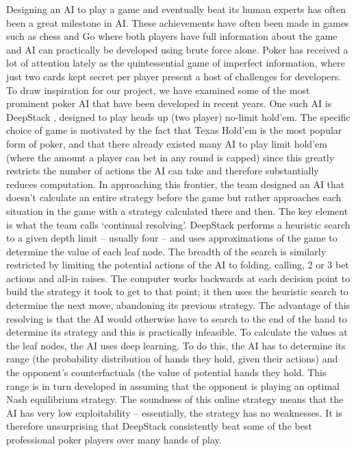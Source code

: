 \documentclass{article}
\begin{document}
\begin{multicols*}{2}
Designing an AI to play a game and eventually beat its human experts has often been a great milestone in AI. These achievements have often been made in games such as chess and Go where both players have full information about the game and AI can practically be developed using brute force alone. Poker has received a lot of attention lately as the quintessential game of imperfect information, where just two cards kept secret per player present a host of challenges for developers. To draw inspiration for our project, we have examined some of the most prominent poker AI that have been developed in recent years.
\newline
One such AI is DeepStack \cite{Deepstack}, designed to play heads up (two player) no-limit hold’em. The specific choice of game is motivated by the fact that Texas Hold’em is the most popular form of poker, and that there already existed many AI to play limit hold’em (where the amount a player can bet in any round is capped) since this greatly restricts the number of actions the AI can take and therefore substantially reduces computation. In approaching this frontier, the team designed an AI that doesn’t calculate an entire strategy before the game but rather approaches each situation in the game with a strategy calculated there and then. The key element is what the team calls ‘continual resolving’. DeepStack performs a heuristic search to a given depth limit – usually four – and uses approximations of the game to determine the value of each leaf node. The breadth of the search is similarly restricted by limiting the potential actions of the AI to folding, calling, 2 or 3 bet actions and all-in raises.
\newline
The computer works backwards at each decision point to build the strategy it took to get to that point; it then uses the heuristic search to determine the next move, abandoning its previous strategy. The advantage of this resolving is that the AI would otherwise have to search to the end of the hand to determine its strategy and this is practically infeasible. To calculate the values at the leaf nodes, the AI uses deep learning. To do this, the AI has to determine its range (the probability distribution of hands they hold, given their actions) and the opponent’s counterfactuals (the value of potential hands they hold. This range is in turn developed in assuming that the opponent is playing an optimal Nash equilibrium strategy.
\newline
The soundness of this online strategy means that the AI has very low exploitability – essentially, the strategy has no weaknesses. It is therefore unsurprising that DeepStack consistently beat some of the best professional poker players over many hands of play.

\end{multicols*}
\end{document}
